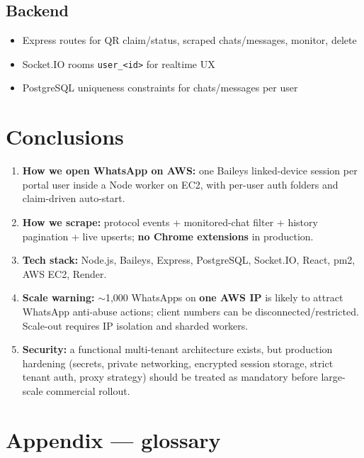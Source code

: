 \documentclass[11pt,a4paper]{article}
\begin{document}
\subsection{Backend}

\begin{itemize}[leftmargin=1.2em]
  \item Express routes for QR claim/status, scraped chats/messages, monitor, delete
  \item Socket.IO rooms \texttt{user\_<id>} for realtime UX
  \item PostgreSQL uniqueness constraints for chats/messages per user
\end{itemize}

\section{Conclusions}

\begin{enumerate}[leftmargin=1.4em]
  \item \textbf{How we open WhatsApp on AWS:} one Baileys linked-device session per portal user inside a Node worker on EC2, with per-user auth folders and claim-driven auto-start.
  \item \textbf{How we scrape:} protocol events + monitored-chat filter + history pagination + live upserts; \textbf{no Chrome extensions} in production.
  \item \textbf{Tech stack:} Node.js, Baileys, Express, PostgreSQL, Socket.IO, React, pm2, AWS EC2, Render.
  \item \textbf{Scale warning:} $\sim$1{,}000 WhatsApps on \textbf{one AWS IP} is likely to attract WhatsApp anti-abuse actions; client numbers can be disconnected/restricted. Scale-out requires IP isolation and sharded workers.
  \item \textbf{Security:} a functional multi-tenant architecture exists, but production hardening (secrets, private networking, encrypted session storage, strict tenant auth, proxy strategy) should be treated as mandatory before large-scale commercial rollout.
\end{enumerate}

\section{Appendix --- glossary}
\end{document}
